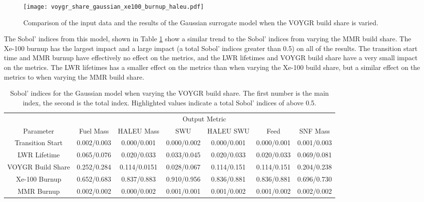 \begin{figure}
    \centering 
    \texttt{[image: voygr\_share\_gaussian\_xe100\_burnup\_haleu.pdf]}
    \caption{Comparison of the input data and the results of the Gaussian 
    surrogate model when the VOYGR build share is varied.}
    \label{fig:s7_voygr_gaussian}
\end{figure}

The Sobol' indices from this model, shown in Table \ref{tab:s7_sobol_voygr_gaussian}
show a similar trend to the Sobol' indices from varying the \gls{MMR}
build share. The Xe-100 burnup has the largest impact and a large impact 
(a total Sobol' indices greater than 0.5) on all of the 
results. The transition start time and \gls{MMR} burnup have effectively no 
effect on the metrics, and the \gls{LWR} lifetimes and VOYGR build share 
have a very small impact on the metrics. The \gls{LWR} lifetimes has a smaller 
effect on the metrics than when varying the Xe-100 build share, but a similar 
effect on the metrics to when varying the \gls{MMR} build share. 

\begin{table}
    \centering
    \caption{Sobol' indices for the Gaussian model when varying the VOYGR 
    build share. The first number is the main index, the second is the total 
    index. Highlighted 
    values indicate a total Sobol' indices of above 0.5.}
    \label{tab:s7_sobol_voygr_gaussian}
    \begin{tabular}{c c c c c c c}
        \hline
        & \multicolumn{6}{c}{Output Metric} \\
        Parameter & Fuel Mass & HALEU Mass & SWU & HALEU SWU & Feed & SNF Mass \\
        \hline
        Transition Start & 0.002/0.003 & 0.000/0.001 & 0.000/0.002 & 
                           0.000/0.001 & 0.000/0.001 & 0.001/0.003\\
        LWR Lifetime & 0.065/0.076 & 0.020/0.033 & 0.033/0.045 & 
                       0.020/0.033 & 0.020/0.033 & 0.069/0.081\\
        VOYGR Build Share & 0.252/0.284 & 0.114/0.0151 & 0.028/0.067 &
                            0.114/0.151 & 0.114/0.151 & 0.204/0.238\\
        Xe-100 Burnup & \cellcolor{green!25}0.652/0.683 & \cellcolor{green!25}0.837/0.883 & \cellcolor{green!25}0.910/0.956 & 
        \cellcolor{green!25}0.836/0.881 & \cellcolor{green!25}0.836/0.881 & \cellcolor{green!25}0.696/0.730\\
        MMR Burnup & 0.002/0.002 & 0.000/0.002 & 0.001/0.001 & 
                     0.001/0.002 & 0.001/0.002 & 0.002/0.002\\
        \hline        
    \end{tabular}
\end{table}

